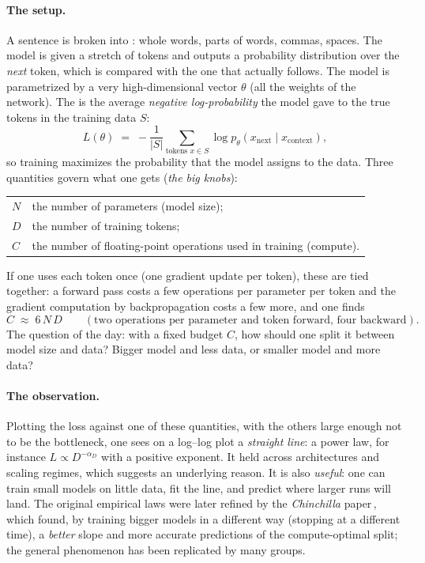 \paragraph{The setup.}
A sentence is broken into : whole words, parts of words, commas, spaces. The model is given a stretch of tokens and outputs a probability distribution over the \emph{next} token, which is compared with the one that actually follows. The model is parametrized by a very high-dimensional vector $\theta$ (all the weights of the network). The 
is the average \emph{negative log-probability} the model gave to the true tokens in the training data $S$:
\[
  L(\theta)\;=\;-\frac1{|S|}\sum_{\text{tokens }x\in S}\log p_\theta(x_{\text{next}}\mid x_{\text{context}}),
\]
so training maximizes the probability that the model assigns to the data. Three quantities govern what one gets (\emph{the big knobs}):
\begin{center}
\begin{tabular}{@{}ll@{}}
$N$ & the number of parameters (model size);\\
$D$ & the number of training tokens;\\
$C$ & the number of floating-point operations used in training (compute).
\end{tabular}
\end{center}
If one uses each token once (one gradient update per token), these are tied together: a forward pass costs a few operations per parameter per token and the gradient computation by backpropagation costs a few more, and one finds
\begin{equation}\label{eq:C6ND}
  C\;\approx\;6\,N\,D\qquad(\text{two operations per parameter and token forward, four backward}).
\end{equation}
The question of the day: with a fixed budget $C$, how should one split it between model size and data? Bigger model and less data, or smaller model and more data?

\paragraph{The observation.}
Plotting the loss against one of these quantities, with the others large enough not to be the bottleneck, one sees on a log--log plot a \emph{straight line}: a power law, for instance $L\propto D^{-\alpha_D}$ with a positive exponent. It held across architectures and scaling regimes, which suggests an underlying reason.
It is also \emph{useful}: one can train small models on little data, fit the line, and predict where larger runs will land. The original empirical laws were later refined by the \emph{Chinchilla} paper\,\citep{hoffmann2022}, which found, by training bigger models in a different way (stopping at a different time), a \emph{better} slope and more accurate predictions of the compute-optimal split; the general phenomenon has been replicated by many groups.

